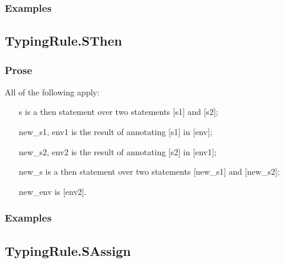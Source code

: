 \documentclass{book}
\begin{document}
    \subsubsection{Examples}

\subsection{TypingRule.SThen}

    \subsubsection{Prose}
    All of the following apply:
   \begin{itemize}
   \item [s] is a then statement over two statements [s1] and [s2];
   \item [new\_s1, env1] is the result of annotating [s1] in [env];
   \item [new\_s2, env2] is the result of annotating [s2] in [env1];
   \item [new\_s] is a then statement over two statements [new\_s1] and [new\_s2];
   \item [new\_env] is [env2].
   \end{itemize}

    \subsubsection{Examples}

\subsection{TypingRule.SAssign}
\end{document}
